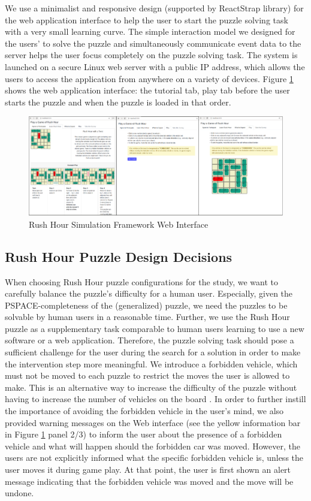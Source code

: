 \documentclass[doctor]{thesis} %
\theoremstyle{plain}
\begin{document}
We use a minimalist and responsive design (supported by ReactStrap library) for the web application interface to help the user to start the puzzle solving task with a very small learning curve. The simple interaction model we designed for the users' to solve the puzzle and simultaneously communicate event data to the server helps the user focus completely on the puzzle solving task. The system is launched on a secure Linux web server with a public IP address, which allows the users to access the application from anywhere on a variety of devices. Figure \ref{fig:ui} shows the web application interface: the tutorial tab, play tab before the user starts the puzzle and when the puzzle is loaded in that order.
\begin{figure}[!hbt]
  \centering
\includegraphics[width=\columnwidth]{img/UI.pdf}
  \caption{Rush Hour Simulation Framework Web Interface}
  \label{fig:ui}
\end{figure}
\subsection*{Rush Hour Puzzle Design Decisions}

When choosing Rush Hour puzzle configurations for the study, we want to carefully balance the puzzle's difficulty for a human user. Especially, given the PSPACE-completeness of the (generalized) puzzle, we need the puzzles to be solvable by human users in a reasonable time. Further, we use the Rush Hour puzzle as a supplementary task comparable to human users learning to use a new software or a web application. Therefore, the puzzle solving task should pose a sufficient challenge for the user during the search for a solution in order to make the intervention step more meaningful. We introduce a forbidden vehicle, which must not be moved to each puzzle to restrict the moves the user is allowed to make. This is an alternative way to increase the difficulty of the puzzle without having to increase the number of vehicles on the board \cite{fernau2003}. In order to further instill the importance of avoiding the forbidden vehicle in the user's mind, we also provided warning messages on the Web interface (see the yellow information bar in Figure \ref{fig:ui} panel 2/3) to inform the user about the presence of a forbidden vehicle and what will happen should the forbidden car was moved. However, the users are not explicitly informed what the specific forbidden vehicle is, unless the user moves it during game play. At that point, the user is first shown an alert message indicating that the forbidden vehicle was moved and the move will be undone.
\end{document}
